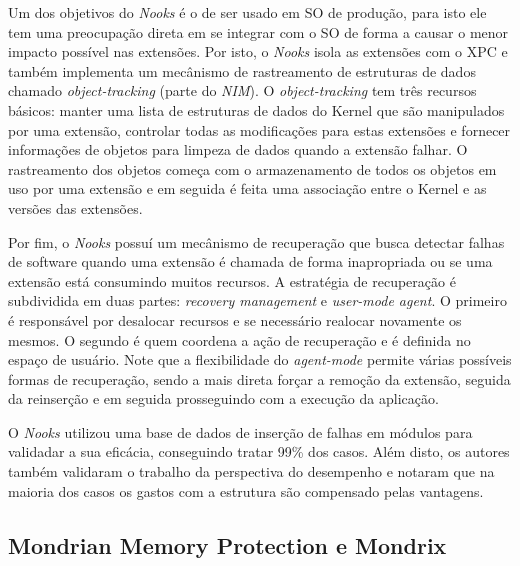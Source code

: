 Um dos objetivos do \emph{Nooks} é o de ser usado em SO de produção, para isto
ele tem uma preocupação direta em se integrar com o SO de forma a causar o
menor impacto possível nas extensões. Por isto, o \emph{Nooks} isola as
extensões com o XPC e também implementa um mecânismo de rastreamento de
estruturas de dados chamado \emph{object-tracking} (parte do \emph{NIM}). O
\emph{object-tracking} tem três recursos básicos: manter uma lista de
estruturas de dados do Kernel que são manipulados por uma extensão, controlar
todas as modificações para estas extensões e fornecer informações de objetos
para limpeza de dados quando a extensão falhar. O rastreamento dos objetos
começa com o armazenamento de todos os objetos em uso por uma extensão e em
seguida é feita uma associação entre o Kernel e as versões das extensões.

Por fim, o \emph{Nooks} possuí um mecânismo de recuperação que busca detectar
falhas de software quando uma extensão é chamada de forma inapropriada ou se
uma extensão está consumindo muitos recursos. A estratégia de recuperação é
subdividida em duas partes: \emph{recovery management} e \emph{user-mode
agent}. O primeiro é responsável por desalocar recursos e se necessário
realocar novamente os mesmos. O segundo é quem coordena a ação de recuperação e
é definida no espaço de usuário. Note que a flexibilidade do \emph{agent-mode}
permite várias possíveis formas de recuperação, sendo a mais direta forçar a
remoção da extensão, seguida da reinserção e em seguida prosseguindo com a
execução da aplicação.

O \emph{Nooks} utilizou uma base de dados de inserção de falhas em módulos para
validadar a sua eficácia, conseguindo tratar 99\% dos casos. Além disto, os
autores também validaram o trabalho da perspectiva do desempenho e notaram que
na maioria dos casos os gastos com a estrutura são compensado pelas vantagens.

\subsection{Mondrian Memory Protection e Mondrix}


